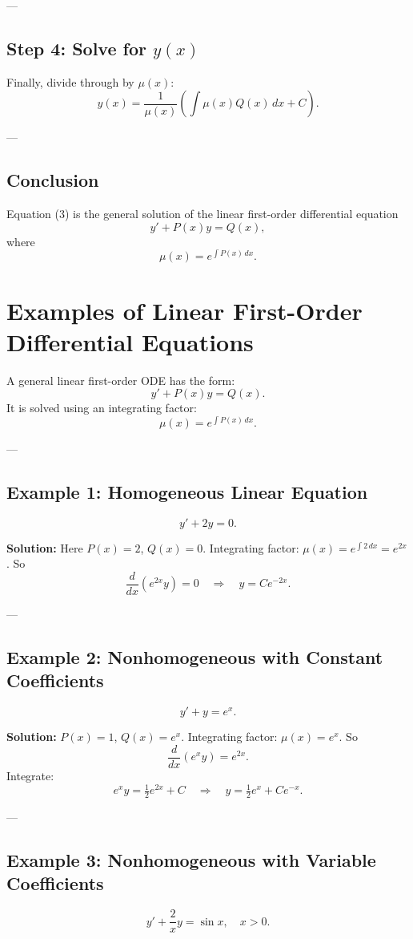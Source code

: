 \documentclass[12pt]{book}
\begin{document}
---

\subsection*{Step 4: Solve for $y(x)$}
Finally, divide through by $\mu(x)$:
\[
y(x) = \frac{1}{\mu(x)} \left( \int \mu(x) Q(x)\, dx + C \right). \tag{3}
\]

---

\subsection*{Conclusion}
Equation (3) is the general solution of the linear first-order differential equation
\[
y' + P(x)y = Q(x),
\]
where
\[
\mu(x) = e^{\int P(x)\,dx}.
\]

\section*{Examples of Linear First-Order Differential Equations}

A general linear first-order ODE has the form:
\[
y' + P(x)y = Q(x).
\]
It is solved using an integrating factor:
\[
\mu(x) = e^{\int P(x)\,dx}.
\]

---

\subsection*{Example 1: Homogeneous Linear Equation}
\[
y' + 2y = 0.
\]

\textbf{Solution:} Here $P(x) = 2$, $Q(x)=0$.  
Integrating factor: $\mu(x) = e^{\int 2\,dx} = e^{2x}$.  
So
\[
\frac{d}{dx}(e^{2x}y) = 0 \quad \Longrightarrow \quad y = Ce^{-2x}.
\]

---

\subsection*{Example 2: Nonhomogeneous with Constant Coefficients}
\[
y' + y = e^x.
\]

\textbf{Solution:} $P(x)=1$, $Q(x)=e^x$.  
Integrating factor: $\mu(x)=e^x$.  
So
\[
\frac{d}{dx}(e^x y) = e^{2x}.
\]
Integrate:
\[
e^x y = \tfrac{1}{2} e^{2x} + C \quad\Longrightarrow\quad
y = \tfrac{1}{2} e^x + C e^{-x}.
\]

---

\subsection*{Example 3: Nonhomogeneous with Variable Coefficients}
\[
y' + \frac{2}{x}y = \sin x, \quad x>0.
\]
\end{document}
